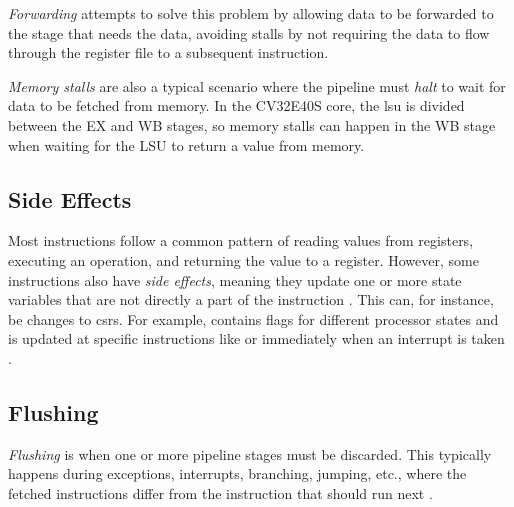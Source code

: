 \textit{Forwarding} attempts to solve this problem by allowing data to be forwarded to the stage that needs the data, avoiding stalls by not requiring the data to flow through the register file to a subsequent instruction.

\textit{Memory stalls} are also a typical scenario where the pipeline must \textit{halt} to wait for data to be fetched from memory. In the CV32E40S core, the \acrshort{lsu} is divided between the EX and WB stages, so memory stalls can happen in the WB stage when waiting for the LSU to return a value from memory.


\subsection{Side Effects}

Most instructions follow a common pattern of reading values from registers, executing an operation, and returning the value to a register.
However, some instructions also have \textit{side effects}, meaning they update one or more state variables that are not directly a part of the instruction \cite{taylorAdvancedRISCVVerification2023}. This can, for instance, be changes to \acrshort{csr}s. For example,  contains flags for different processor states and is updated at specific instructions like  or immediately when an interrupt is taken \cite{openhwgroupExceptionsInterruptsCOREV2023}. 


%

\subsection{Flushing}
\label{sec:bg_flushing}

\textit{Flushing} is when one or more pipeline stages must be discarded. This typically happens during exceptions, interrupts, branching, jumping, etc., where the fetched instructions differ from the instruction that should run next \cite{pattersonComputerOrganizationDesign2021}.

